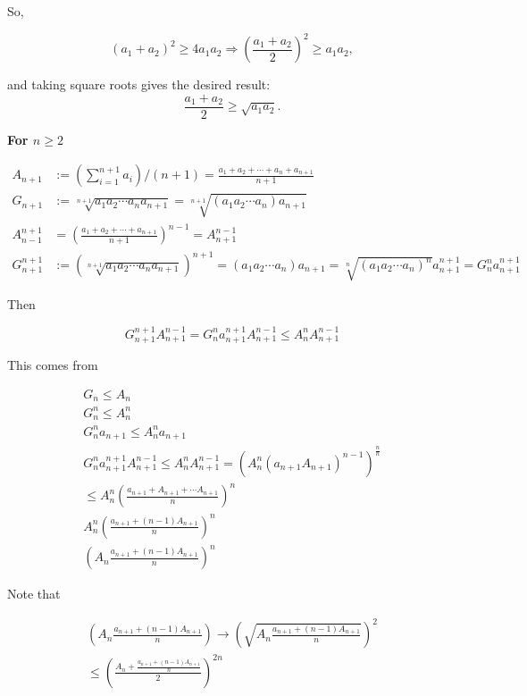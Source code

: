 So,

\[
	{(a_1 + a_2)}^2 \geq 4a_1a_2 \Rightarrow {\left( \frac{a_1 + a_2}{2} \right)}^2 \geq a_1a_2,
\]

and taking square roots gives the desired result:
\[
	\frac{a_1 + a_2}{2} \geq \sqrt{a_1 a_2}.
\]

\textbf{For \( n \geq 2 \)}

\begin{align*}
	A_{n + 1} &:= (\sum_{i=1}^{n + 1} a_i) / (n + 1) = \frac{a_1 + a_2 + \cdots + a_n + a_{n + 1}}{n + 1}\\
	G_{n + 1} &:= \sqrt[n + 1]{a_1 a_2 \cdots a_n a_{n + 1}} = \sqrt[n + 1]{(a_1 a_2 \cdots a_n) a_{n + 1}}\\
	A_{n - 1}^{n + 1}&= {(\frac{a_1 + a_2 + \cdots + a_{n + 1}}{n + 1})}^{n - 1} = A_{n + 1}^{n - 1}\\
	G_{n + 1}^{n + 1} &:= {(\sqrt[n + 1]{a_1 a_2 \cdots a_n a_{n + 1}})}^{n + 1} = (a_1 a_2 \cdots a_n) a_{n + 1} = \sqrt[n]{{(a_1 a_2 \cdots a_n)}^{n}} a_{n + 1}^{n + 1} = G_{n}^{n} a_{n + 1}^{n + 1}
\end{align*}

Then

\[G_{n + 1}^{n + 1}  A_{n + 1}^{n - 1} = G_{n}^{n} a_{n + 1}^{n + 1} A_{n + 1}^{n - 1} \leq A_{n}^{n} A_{n + 1}^{n - 1}\]

This comes from

\begin{align*}
		G_n \leq A_n\\
		G_n^{n} \leq A_n^{n}\\
		G_n^{n} a_{n+1} \leq A_n^{n} a_{n+1}\\
		G_{n}^{n} a_{n + 1}^{n + 1} A_{n + 1}^{n - 1} \leq A_{n}^{n} A_{n + 1}^{n - 1} = {\left(A_{n}^{n} {\left( a_{n + 1} A_{n +1}\right)}^{n -1} \right)}^{\frac{n}{n}}\\
		\leq A_{n}^{n} {\left( \frac{a_{n + 1} + A_{n + 1} + \cdots A_{n + 1}}{n} \right)}^{n}\\
		A_{n}^{n} {\left( \frac{a_{n + 1} + (n - 1)A_{n + 1}}{n} \right)}^{n}\\
		{\left( A_{n} \frac{a_{n + 1} + (n - 1)A_{n + 1}}{n} \right)}^{n}
\end{align*}

Note that

\begin{align*}
	\left( A_{n} \frac{a_{n + 1} + (n - 1)A_{n + 1}}{n} \right) \rightarrow  {\left( \sqrt{A_{n} \frac{a_{n + 1} + (n - 1)A_{n + 1}}{n}} \right)}^{2}\\
	\leq {\left( \frac{ A_n + \frac{a_{n + 1} + (n - 1)A_{n + 1}}{n}}{2} \right)}^{2n}
\end{align*}

